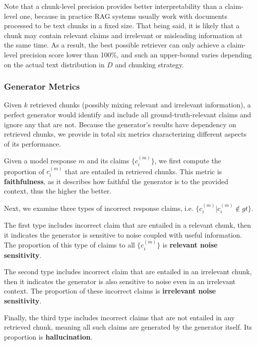 Note that a chunk-level precision provides better interpretability than a claim-level one, because in practice RAG systems usually work with documents processed to be text chunks in a fixed size. That being said, it is likely that a chunk may contain relevant claims and irrelevant or misleading information at the same time. As a result, the best possible retriever can only achieve a claim-level precision score lower than 100\%, and such an upper-bound varies depending on the actual text distribution in $D$ and chunking strategy.

\subsubsection{Generator Metrics}

Given $k$ retrieved chunks (possibly mixing relevant and irrelevant information), a perfect generator would identify and include all ground-truth-relevant claims and ignore any that are not. Because the generator’s results have dependency on retrieved chunks, we provide in total six metrics characterizing different aspects of its performance.

Given a model response $m$ and its claims $\{c^{(m)}_i\}$, we first compute the proportion of $c^{(m)}_i$ that are entailed in retrieved chunks. This metric is \textbf{faithfulness}, as it describes how faithful the generator is to the provided context, thus the higher the better.

Next, we examine three types of incorrect response claims, i.e. $\{c^{(m)}_i | c^{(m)}_i \notin gt\}$.

\begin{enumerate*}

\item The first type includes incorrect claim that are entailed in a relevant chunk, then it indicates the generator is sensitive to noise coupled with useful information. The proportion of this type of claims to all $\{c^{(m)}_i\}$ is \textbf{relevant noise sensitivity}.
\item The second type includes incorrect claim that are entailed in an irrelevant chunk, then it indicates the generator is also sensitive to noise even in an irrelevant context. The proportion of these incorrect claims is \textbf{irrelevant noise sensitivity}.
\item Finally, the third type includes incorrect claims that are not entailed in any retrieved chunk, meaning all such claims are generated by the generator itself. Its proportion is \textbf{hallucination}.
\end{enumerate*}

